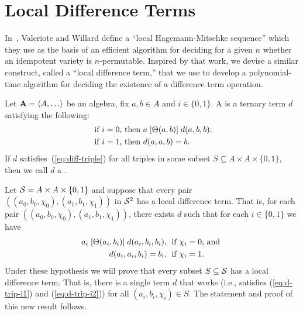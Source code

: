 \section{Local Difference Terms}
\label{sec:local-diff-terms}
In~\cite{MR3239624},
Valeriote and Willard define %
a ``local Hagemann-Mitschke sequence'' which they use as the basis of
an efficient algorithm for deciding for a given $n$ whether an idempotent
variety is $n$-permutable.
Inspired by that work, we devise a similar construct, called
a ``local difference term,'' that we use to develop a polynomial-time
algorithm for deciding the existence of a difference term operation.

Let $\bA=\< A, \dots\>$ be an algebra, fix $a, b \in A$ and
$i \in \{0,1\}$.
A  is a ternary term $d$ satisfying the following:
\begin{align}
\text{ if $i=0$, then } & a \mathrel{[\Theta(a,b)]} d(a,b,b); \label{eq:diff-triple}\\
\text{ if $i=1$, then } &d(a,a,b) = b. \nonumber
\end{align}
If $d$ satisfies~(\ref{eq:diff-triple}) for all triples
in some subset $S\subseteq A \times A \times \{0,1\}$, then we call $d$
a .

Let
$\mathcal{S} = A \times A \times \{0,1\}$ and
suppose that every pair
$((a_0, b_0, \chi_0), (a_1, b_1, \chi_1))$
in $\mathcal{S}^2$ has a local difference term.
That is, for each pair $((a_0, b_0, \chi_0), (a_1, b_1, \chi_1))$, there exists
$d$ such that for each $i \in \{0,1\}$ we have
\begin{align}
  a_i \Comr{\Cg(a_i,b_i)} d(a_i,b_i,b_i), & \;
  \text{ if $\chi_i=0$, and }  \label{eq:d-trip-i1}\\
  d(a_i,a_i,b_i) =b_i, & \;
  \text{ if $\chi_i=1$.}\label{eq:d-trip-i2} %
\end{align}
Under these hypothesis we will prove that every subset $S\subseteq \mathcal{S}$
has a local difference term.
That is, there is a single term $d$ that works (i.e., satisfies
(\ref{eq:d-trip-i1}) and (\ref{eq:d-trip-i2})) for all $(a_i, b_i, \chi_i) \in S$.
The statement and proof of this new result follows.

